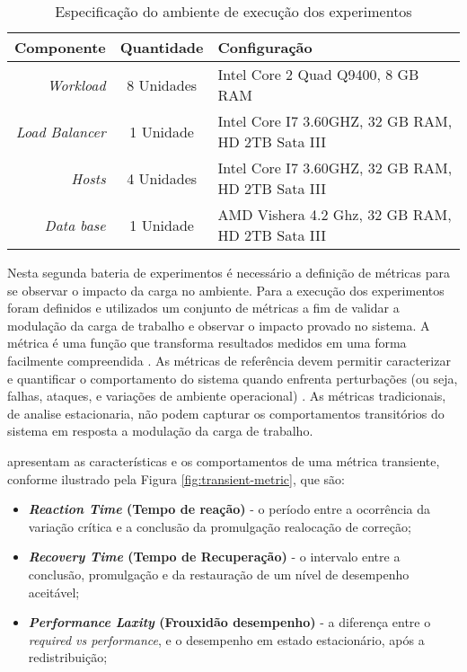 \begin{table}[htb]
	\centering
	\caption{Especificação do ambiente de execução dos experimentos}
	\label{tab:configuracao_maquinas}
	\begin{tabularx}{\textwidth}{|r|c|X|} \hline\hline
		\textbf{Componente}    & \textbf{Quantidade} & \textbf{Configuração} \\ \hline
		\textit{Workload}      & 8 Unidades          & Intel Core 2 Quad Q9400, 8 GB RAM  \\
		\textit{Load Balancer} & 1 Unidade           & Intel Core I7 3.60GHZ, 32 GB RAM, HD 2TB Sata III \\
		\textit{Hosts}         & 4 Unidades          & Intel Core I7 3.60GHZ, 32 GB RAM, HD 2TB Sata III\\
		\textit{Data base}     & 1 Unidade           & AMD Vishera 4.2 Ghz, 32 GB RAM, HD 2TB Sata III \\
		\hline
	\end{tabularx}
	\fdadospesquisa
\end{table}
Nesta segunda bateria de experimentos é necessário a definição de métricas para se observar o impacto da carga no ambiente. Para a execução dos experimentos foram definidos e utilizados um conjunto de métricas a fim de validar a modulação da carga de trabalho e observar o impacto provado no sistema. A métrica é uma função que transforma resultados medidos em uma forma facilmente compreendida \cite{Folkerts2013}. As métricas de referência devem permitir caracterizar e quantificar o comportamento do sistema quando enfrenta perturbações (ou seja, falhas, ataques, e variações de ambiente operacional) \cite{Marco2012}. As métricas tradicionais, de analise estacionaria, não podem capturar os comportamentos transitórios do sistema em resposta a modulação da carga de trabalho.

 apresentam as características e os comportamentos de uma métrica transiente, conforme ilustrado pela Figura \ref{fig:transient-metric}, que são: 
\begin{itemize}
	\item \textbf{\textit{Reaction Time} (Tempo de reação)} - o período entre a ocorrência da variação crítica e a conclusão da promulgação realocação de correção;
	
	\item \textbf{\textit{Recovery Time} (Tempo de Recuperação)} - o intervalo entre a conclusão, promulgação e da restauração de um nível de desempenho aceitável;
	
	\item \textbf{\textit{Performance Laxity} (Frouxidão desempenho)} - a diferença entre o \textit{required vs performance}, e o desempenho em estado estacionário, após a redistribuição;
\end{itemize}



